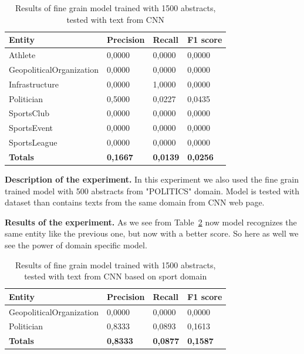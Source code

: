 \documentclass[thesis=M,english]{FITthesis}[2018/05/30]
\begin{document}
\begin{table}[H]\centering
	\begin{tabular}{|l|l|l|l|}
		\hline {\textbf{Entity}} & {\textbf{Precision}} & {\textbf{Recall}} & {\textbf{F1 score}}\\\hline
        Athlete & 0,0000 & 0,0000 & 0,0000\\
 		GeopoliticalOrganization & 0,0000 & 0,0000 & 0,0000\\
 		Infrastructure & 0,0000 & 1,0000 & 0,0000\\
     	Politician & 0,5000 & 0,0227 & 0,0435\\
		SportsClub & 0,0000 & 0,0000 & 0,0000\\
    	SportsEvent & 0,0000 & 0,0000 & 0,0000\\
   		SportsLeague & 0,0000 & 0,0000 & 0,0000\\\hline  
		\textbf{Totals} & \textbf{0,1667} & \textbf{0,0139} & \textbf{0,0256}\\\hline
	\end{tabular}			
		\caption{Results of fine grain model trained with 1500 abstracts, tested with text from CNN\label{table:CNNWith1500Model}}
	\end{table}	
	

\textbf{Description of the experiment.} In this experiment we also used the fine grain trained model with 500 abstracts from "POLITICS" domain. Model is tested with dataset than contains texts from the same domain from CNN web page. 

\textbf{Results of the experiment.} As we see from Table~\ref{table:CNNPoliticsWith500PoliticsModel} now model recognizes the same entity like the previous one, but now with a better score. So here as well we see the power of domain specific model.

	
	\begin{table}[H]\centering
	\begin{tabular}{|l|l|l|l|}
		\hline {\textbf{Entity}} & {\textbf{Precision}} & {\textbf{Recall}} & {\textbf{F1 score}}\\\hline
		GeopoliticalOrganization & 0,0000 & 0,0000 & 0,0000\\
     	Politician & 0,8333 & 0,0893 & 0,1613\\\hline
		\textbf{Totals} & \textbf{0,8333} & \textbf{0,0877} & \textbf{0,1587 }\\\hline
	\end{tabular}			
		\caption{Results of fine grain model trained with 1500 abstracts, tested with text from CNN based on sport domain\label{table:CNNPoliticsWith500PoliticsModel}}
	\end{table}
	
\end{document}
